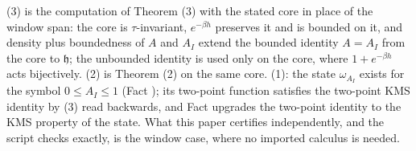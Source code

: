 (3) is the computation of Theorem (3) with the stated core in place of the window span: the core is $\tau$-invariant, $e^{-\beta h}$ preserves it and is bounded on it, and density plus boundedness of $A$ and $A_I$ extend the bounded identity $A = A_I$ from the core to $\mathfrak{h}$; the unbounded identity is used only on the core, where $1 + e^{-\beta h}$ acts bijectively. (2) is Theorem (2) on the same core. (1): the state $\omega_{A_I}$ exists for the symbol $0 \le A_I \le 1$ (Fact ); its two-point function satisfies the two-point KMS identity by (3) read backwards, and Fact  upgrades the two-point identity to the KMS property of the state. What this paper certifies independently, and the script checks exactly, is the window case, where no imported calculus is needed.
